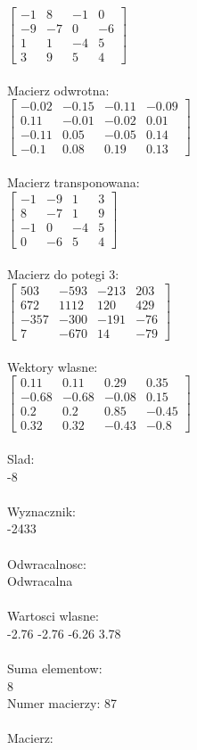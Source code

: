 \documentclass[a4paper,12pt]{article}
\begin{document}
$\begin{bmatrix} -1&8&-1&0\\-9&-7&0&-6\\1&1&-4&5\\3&9&5&4 \end{bmatrix}$
\\
\\
Macierz odwrotna:\\

$\begin{bmatrix} -0.02&-0.15&-0.11&-0.09\\0.11&-0.01&-0.02&0.01\\-0.11&0.05&-0.05&0.14\\-0.1&0.08&0.19&0.13 \end{bmatrix}$
\\
\\
Macierz transponowana:\\

$\begin{bmatrix} -1&-9&1&3\\8&-7&1&9\\-1&0&-4&5\\0&-6&5&4 \end{bmatrix}$
\\
\\
Macierz do potegi 3:\\

$\begin{bmatrix} 503&-593&-213&203\\672&1112&120&429\\-357&-300&-191&-76\\7&-670&14&-79 \end{bmatrix}$
\\
\\
Wektory wlasne:\\

$\begin{bmatrix} 0.11&0.11&0.29&0.35\\-0.68&-0.68&-0.08&0.15\\0.2&0.2&0.85&-0.45\\0.32&0.32&-0.43&-0.8 \end{bmatrix}$
\\
\\
Slad:\\
-8
\\
\\
Wyznacznik:\\
-2433
\\
\\
Odwracalnosc:\\
Odwracalna
\\
\\
Wartosci wlasne:\\
-2.76 -2.76 -6.26 3.78
\\
\\
Suma elementow:\\
8
\\
\newpage
Numer macierzy:
87
\\
\\
Macierz:\\
\end{document}
